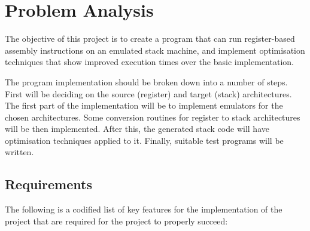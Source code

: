 \chapter{Problem Analysis}\label{ch:problemanalysis}
The objective of this project is to create a program that can run
register-based assembly instructions on an emulated stack machine, and implement
optimisation techniques that show improved execution times over the basic
implementation.

The program implementation should be broken down into a number of steps. First
will be deciding on the source (register) and target (stack) architectures.  The
first part of the implementation will be to implement emulators for the chosen
architectures.  Some conversion routines for register to stack architectures
will be then implemented. After this, the generated stack code will have
optimisation techniques applied to it. Finally, suitable test programs will be
written.

\section{Requirements}
The following is a codified list of key features for the implementation of
the project that are required for the project to properly succeed:

